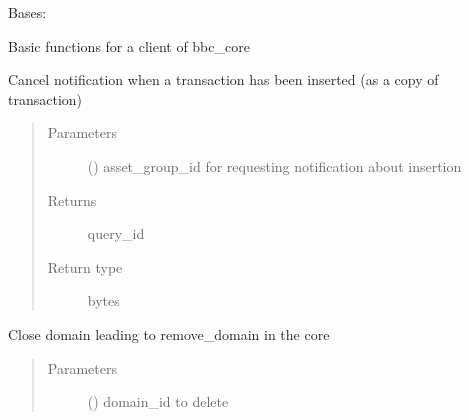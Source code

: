 \documentclass[letterpaper,10pt,english]{sphinxmanual}
\begin{document}
\begin{fulllineitems}
\label{\detokenize{bbc1.core.bbc_app:bbc1.core.bbc_app.BBcAppClient}}
Bases: 

Basic functions for a client of bbc\_core

\begin{fulllineitems}
\label{\detokenize{bbc1.core.bbc_app:bbc1.core.bbc_app.BBcAppClient.cancel_insert_completion_notification}}
Cancel notification when a transaction has been inserted (as a copy of transaction)
\begin{quote}\begin{description}
\item[{Parameters}] \leavevmode
{} () \textendash{} asset\_group\_id for requesting notification about insertion

\item[{Returns}] \leavevmode
query\_id

\item[{Return type}] \leavevmode
bytes

\end{description}\end{quote}

\end{fulllineitems}


\begin{fulllineitems}
\label{\detokenize{bbc1.core.bbc_app:bbc1.core.bbc_app.BBcAppClient.domain_close}}
Close domain leading to remove\_domain in the core
\begin{quote}\begin{description}
\item[{Parameters}] \leavevmode
{} () \textendash{} domain\_id to delete


\end{description}
\end{quote}
\end{fulllineitems}
\end{fulllineitems}
\end{document}
